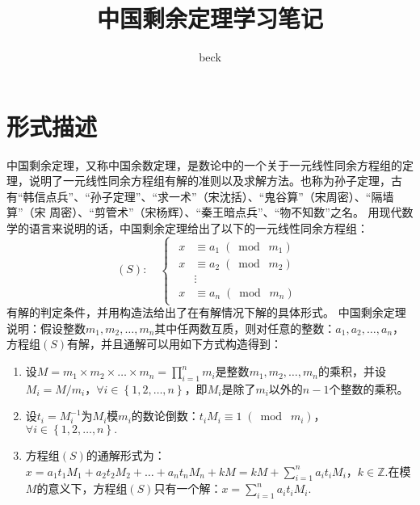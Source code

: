 \documentclass[UTF8]{ctexart}
\title{中国剩余定理学习笔记}
\author{beck}
\begin{document}
\maketitle
\vfill
\section*{形式描述}
中国剩余定理\cite{中国剩余定理}，又称中国余数定理，是数论中的一个关于一元线性同余方程组的定理，说明了一元线性同余方程组有解的准则以及求解方法。也称为孙子定理，古有“韩信点兵”、“孙子定理”、“求一术”（宋沈括）、“鬼谷算”（宋周密）、“隔墙算”（宋 周密）、“剪管术”（宋杨辉）、“秦王暗点兵”、“物不知数”之名。
用现代数学的语言来说明的话，中国剩余定理给出了以下的一元线性同余方程组：
\[
    (S):\quad
    \begin{cases}
        \begin{aligned}
            x & \equiv a_1 \;(\bmod\;m_1) \\
            x & \equiv a_2 \;(\bmod\;m_2) \\
              & \vdots                    \\
            x & \equiv a_n \;(\bmod\;m_n)
        \end{aligned}
    \end{cases}
\]
有解的判定条件，并用构造法给出了在有解情况下解的具体形式。
中国剩余定理说明：假设整数$m_1,m_2,\ldots,m_n$其中任两数互质，则对任意的整数：$a_1,a_2,\ldots,a_n$，方程组$(S)$有解，并且通解可以用如下方式构造得到：
\begin{enumerate}[1.]
    \item 设$M = m_1 \times m_2 \times \ldots \times m_n = {\displaystyle \prod_{i=1}^n m_i}$是整数$m_1,m_2,\ldots,m_n$的乘积，并设$M_i=M/m_i$，$\forall i \in \left\{1,2,\ldots,n\right\}$，即$M_i$是除了$m_i$以外的$n - 1$个整数的乘积。
    \item 设$t_i = M_i^{-1}$为$M_i$模$m_i$的数论倒数：$t_iM_i \equiv 1\;(\bmod\;m_i)$，$\forall i \in \left\{1,2,\ldots,n\right\}.$
    \item 方程组$(S)$的通解形式为：$x = a_1t_1M_1 + a_2t_2M_2 + \ldots + a_nt_nM_n + kM = kM + {\displaystyle \sum_{i=1}^n a_it_iM_i}$，$k \in \mathbb{Z}.$在模$M$的意义下，方程组$(S)$只有一个解：$x = {\displaystyle \sum_{i=1}^n a_it_iM_i}.$
\end{enumerate}
\end{document}
